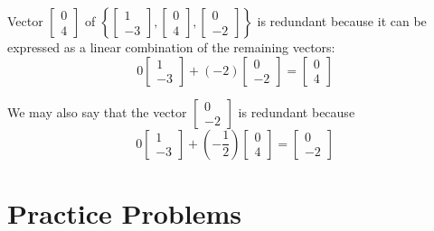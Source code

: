 \documentclass{ximera}
\begin{document}
\begin{example} Vector $\begin{bmatrix}0\\4\end{bmatrix}$ of $\left\{\begin{bmatrix}1\\-3\end{bmatrix},\begin{bmatrix}0\\4\end{bmatrix}, \begin{bmatrix}0\\-2\end{bmatrix}\right\}$ is redundant because it can be expressed as a linear combination of the remaining vectors:  
$$0\begin{bmatrix}1\\-3\end{bmatrix}+(-2)\begin{bmatrix}0\\-2\end{bmatrix}= \begin{bmatrix}0\\4\end{bmatrix}$$

We may also say that the vector $\begin{bmatrix}0\\-2\end{bmatrix}$ is redundant because
$$0\begin{bmatrix}1\\-3\end{bmatrix}+\left(-\frac{1}{2}\right)\begin{bmatrix}0\\4\end{bmatrix}= \begin{bmatrix}0\\-2\end{bmatrix}$$
\end{example}



\section*{Practice Problems}
\end{document}
